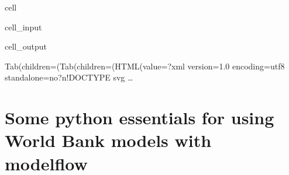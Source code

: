 \documentclass[letterpaper,10pt,english]{jupyterBook}
\begin{document}
\begin{sphinxuseclass}{cell}\begin{sphinxVerbatimInput}

\begin{sphinxuseclass}{cell_input}
\begin{sphinxVerbatim}[commandchars=\\\{\}]
\PYG{p}{[}\PYG{p}{]}
\end{sphinxVerbatim}

\end{sphinxuseclass}\end{sphinxVerbatimInput}
\begin{sphinxVerbatimOutput}

\begin{sphinxuseclass}{cell_output}
\begin{sphinxVerbatim}[commandchars=\\\{\}]
Tab(children=(Tab(children=(HTML(value=\PYGZsq{}\PYGZlt{}?xml version=\PYGZdq{}1.0\PYGZdq{} encoding=\PYGZdq{}utf\PYGZhy{}8\PYGZdq{} standalone=\PYGZdq{}no\PYGZdq{}?\PYGZgt{}\PYGZbs{}n\PYGZlt{}!DOCTYPE svg …
\end{sphinxVerbatim}

\begin{sphinxVerbatim}[commandchars=\\\{\}]

\end{sphinxVerbatim}

\end{sphinxuseclass}\end{sphinxVerbatimOutput}

\end{sphinxuseclass}
\sphinxstepscope


\part{Some python essentials for using World Bank models with modelflow}

\sphinxstepscope
\end{document}
